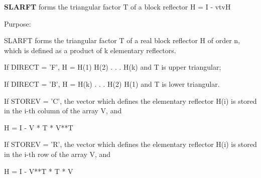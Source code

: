 {\bfseries S\+L\+A\+R\+F\+T} forms the triangular factor T of a block reflector H = I -\/ vtv\+H 

 \begin{DoxyParagraph}{Purpose\+: }
\begin{DoxyVerb} SLARFT forms the triangular factor T of a real block reflector H
 of order n, which is defined as a product of k elementary reflectors.

 If DIRECT = 'F', H = H(1) H(2) . . . H(k) and T is upper triangular;

 If DIRECT = 'B', H = H(k) . . . H(2) H(1) and T is lower triangular.

 If STOREV = 'C', the vector which defines the elementary reflector
 H(i) is stored in the i-th column of the array V, and

    H  =  I - V * T * V**T

 If STOREV = 'R', the vector which defines the elementary reflector
 H(i) is stored in the i-th row of the array V, and

    H  =  I - V**T * T * V\end{DoxyVerb}
 
\end{DoxyParagraph}


